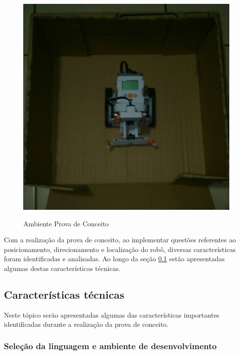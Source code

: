 		\begin{figure}[H]
			\centering
			\includegraphics[scale=0.4]{figuras/ambienteConceito.eps}
			\label{img:ambienteProva}
			\caption{Ambiente Prova de Conceito}
		\end{figure}

		Com a realização da prova de conceito, ao implementar questões referentes ao posicionamento, direcionamento e localização do robô, diversas características foram identificadas e analisadas. Ao longo da seção \ref{sub:características_técnicas} estão apresentadas algumas destas características técnicas.


	\subsection{Características técnicas} %
	\label{sub:características_técnicas}

		Neste tópico serão apresentadas algumas das características importantes identificadas durante a realização da prova de conceito.

		\subsubsection{Seleção da linguagem e ambiente de desenvolvimento}

